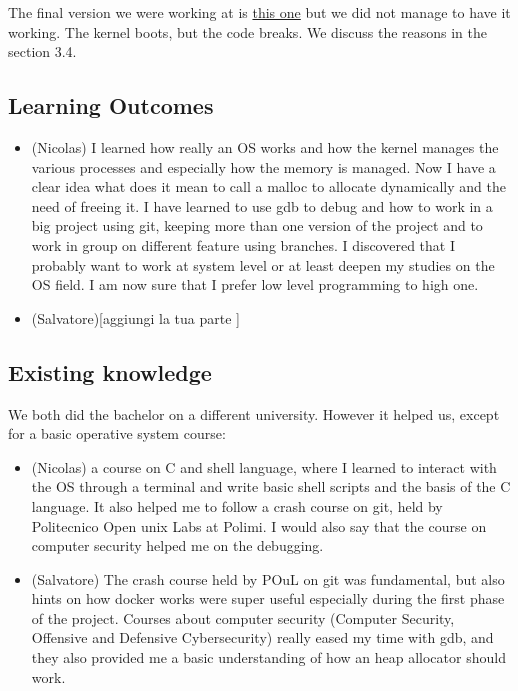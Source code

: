 \documentclass{article}
\begin{document}
The final version we were working at is \href{inserire link alla final version}{this one} but we did not manage to have it working. The kernel boots, but the code breaks. We discuss the reasons in the section 3.4.


\subsection{Learning Outcomes}

\begin{itemize}
    \item (Nicolas) I learned how really an OS works and how the kernel manages the various processes and especially how the memory is managed. Now I have a clear idea what does it mean to call a malloc to allocate  dynamically and the need of freeing it. I have learned to use gdb to debug and how to work in a big project using git, keeping more than one version of the project and to work in group on different feature using branches. I discovered that I probably want to work at system level or at least deepen my studies on the OS field. I am now sure that I prefer low level programming to high one.
    \item (Salvatore)[aggiungi la tua parte ]
\end{itemize}

 

\subsection{Existing knowledge}

We both did the bachelor on a different university. However it helped us, except for a basic operative system course:
\begin{itemize}
    \item (Nicolas) a course on C and shell language, where I learned to interact with the OS through a terminal and write basic shell scripts and the basis of the C language. It also helped me to follow a crash course on git, held by Politecnico Open unix Labs at Polimi. 
    I would also say that the course on computer security helped me on the debugging.
    \item(Salvatore) The crash course held by POuL on git was fundamental, but also hints on how docker works were super useful especially during the first phase of the project.
    Courses about computer security (Computer Security, Offensive and Defensive Cybersecurity) really eased my time with gdb, 
    and they also provided me a basic understanding of how an heap allocator should work.  
\end{itemize}
\end{document}
